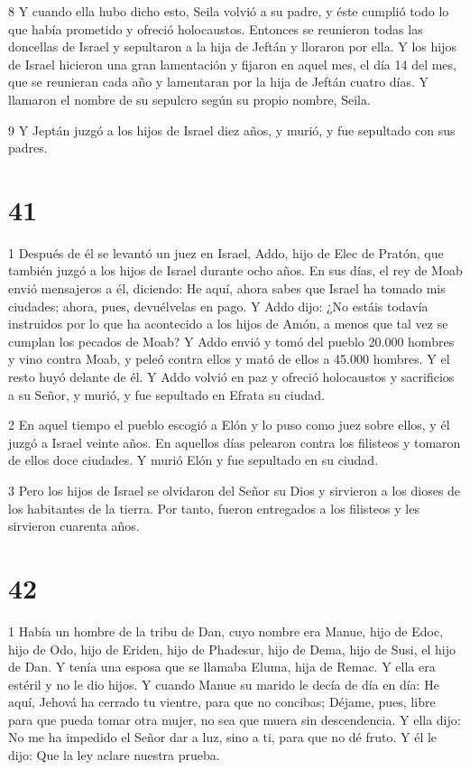 \par 8 Y cuando ella hubo dicho esto, Seila volvió a su padre, y éste cumplió todo lo que había prometido y ofreció holocaustos. Entonces se reunieron todas las doncellas de Israel y sepultaron a la hija de Jeftán y lloraron por ella. Y los hijos de Israel hicieron una gran lamentación y fijaron en aquel mes, el día 14 del mes, que se reunieran cada año y lamentaran por la hija de Jeftán cuatro días. Y llamaron el nombre de su sepulcro según su propio nombre, Seila.

\par 9 Y Jeptán juzgó a los hijos de Israel diez años, y murió, y fue sepultado con sus padres.

\chapter{41}

\par 1 Después de él se levantó un juez en Israel, Addo, hijo de Elec de Pratón, que también juzgó a los hijos de Israel durante ocho años. En sus días, el rey de Moab envió mensajeros a él, diciendo: He aquí, ahora sabes que Israel ha tomado mis ciudades; ahora, pues, devuélvelas en pago. Y Addo dijo: ¿No estáis todavía instruidos por lo que ha acontecido a los hijos de Amón, a menos que tal vez se cumplan los pecados de Moab? Y Addo envió y tomó del pueblo 20.000 hombres y vino contra Moab, y peleó contra ellos y mató de ellos a 45.000 hombres. Y el resto huyó delante de él. Y Addo volvió en paz y ofreció holocaustos y sacrificios a su Señor, y murió, y fue sepultado en Efrata su ciudad.

\par 2 En aquel tiempo el pueblo escogió a Elón y lo puso como juez sobre ellos, y él juzgó a Israel veinte años. En aquellos días pelearon contra los filisteos y tomaron de ellos doce ciudades. Y murió Elón y fue sepultado en su ciudad.

\par 3 Pero los hijos de Israel se olvidaron del Señor su Dios y sirvieron a los dioses de los habitantes de la tierra. Por tanto, fueron entregados a los filisteos y les sirvieron cuarenta años.

\chapter{42}

\par 1 Había un hombre de la tribu de Dan, cuyo nombre era Manue, hijo de Edoc, hijo de Odo, hijo de Eriden, hijo de Phadesur, hijo de Dema, hijo de Susi, el hijo de Dan. Y tenía una esposa que se llamaba Eluma, hija de Remac. Y ella era estéril y no le dio hijos. Y cuando Manue su marido le decía de día en día: He aquí, Jehová ha cerrado tu vientre, para que no concibas; Déjame, pues, libre para que pueda tomar otra mujer, no sea que muera sin descendencia. Y ella dijo: No me ha impedido el Señor dar a luz, sino a ti, para que no dé fruto. Y él le dijo: Que la ley aclare nuestra prueba.

